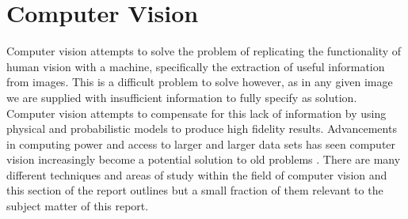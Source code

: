 \section{Computer Vision}

Computer vision attempts to solve the problem of replicating the functionality of human vision with a machine, specifically the extraction of useful information from images. This is a difficult problem to solve however, as in any given image we are supplied with insufficient information to fully specify as solution. Computer vision attempts to compensate for this lack of information by using physical and probabilistic models to produce high fidelity results. Advancements in computing power and access to larger and larger data sets has seen computer vision increasingly become a potential solution to old problems \cite{alg_apps}. There are many different techniques and areas of study within the field of computer vision and this section of the report outlines but a small fraction of them relevant to the subject matter of this report.  





